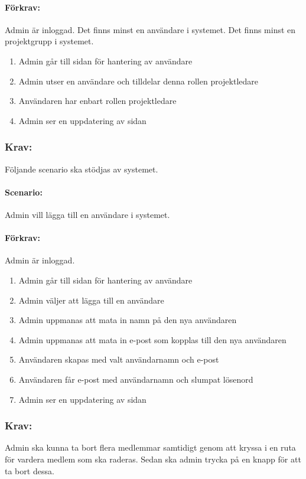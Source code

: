 \documentclass[paper=a4, fontsize=11pt,twoside]{article}
\begin{document}
\paragraph{Förkrav:}
Admin är inloggad. Det finns minst en användare i systemet. Det finns minst en projektgrupp i systemet.
\begin{enumerate}
\item Admin går till sidan för hantering av användare
\item Admin utser en användare och tilldelar denna rollen projektledare
\item Användaren har enbart rollen projektledare
\item Admin ser en uppdatering av sidan
\end{enumerate}

\subsubsection{Krav:} Följande scenario ska stödjas av systemet. 
\paragraph{Scenario:}
Admin vill lägga till en användare i systemet.
\paragraph{Förkrav:}
Admin är inloggad. 
\begin{enumerate}
\item Admin går till sidan för hantering av användare
\item Admin väljer att lägga till en användare
\item Admin uppmanas att mata in namn på den nya användaren
\item Admin uppmanas att mata in e-post som kopplas till den nya användaren
\item Användaren skapas med valt användarnamn och e-post
\item Användaren får e-post med användarnamn och slumpat lösenord
\item Admin ser en uppdatering av sidan
\end{enumerate}

\subsubsection{Krav:} Admin ska kunna ta bort flera medlemmar samtidigt genom att kryssa i en ruta för vardera medlem som ska raderas. Sedan ska admin trycka på en knapp för att ta bort dessa.
\end{document}
